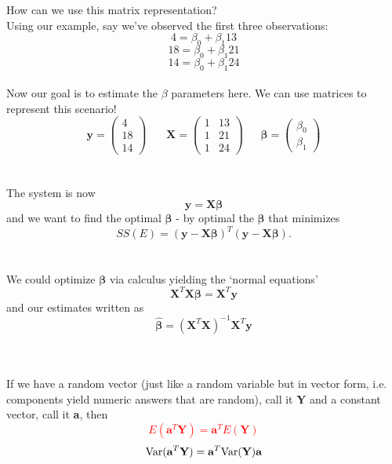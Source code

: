 \Large How can we use this matrix representation?\large\\
Using our example, say we've observed the first three observations:
$$4=\beta_0+\beta_{1}13$$
$$18=\beta_0+\beta_{1}21$$
$$14=\beta_0+\beta_{1}24$$~\\
Now our goal is to estimate the $\beta$ parameters here.  We can use matrices to represent this scenario!
$$\textbf{y}=\left(\begin{array}{c}4 \\ 18\\ 14\end{array}\right)~~~~~~~~\textbf{X}=\left(\begin{array}{cc} 1 & 13\\ 1 & 21 \\ 1 & 24\end{array}\right)~~~~~~~\boldsymbol{\beta}=\left(\begin{array}{c}\beta_0\\\beta_1\end{array}\right)$$
~\\~\\
The system is now
$$\textbf{y}=\textbf{X}\boldsymbol{\beta}$$
and we want to find the optimal $\boldsymbol{\beta}$ - by optimal the $\boldsymbol{\beta}$ that minimizes 
$$SS(E) = (\textbf{y}-\textbf{X}\boldsymbol{\beta})^T(\textbf{y}-\textbf{X}\boldsymbol{\beta}).$$~\\~\\
We could optimize $\boldsymbol{\beta}$ via calculus yielding the `normal equations'
$$\textbf{X}^{T}\textbf{X}\boldsymbol{\beta}=\textbf{X}^{T}\textbf{y}$$
and our estimates written as 
$$\boldsymbol{\hat{\beta}}=\left(\textbf{X}^{T}\textbf{X}\right)^{-1}\textbf{X}^{T}\textbf{y}$$~\\~\\

\newpage

If we have a random vector (just like a random variable but in vector form, i.e. components yield numeric answers that are random), call it $\textbf{Y}$ and a constant vector, call it \textbf{a}, then%
\textcolor{red}{$$E(\textbf{a}^{T}\textbf{Y}) = \textbf{a}^{T}E(\textbf{Y})$$
$$\mbox{Var}(\textbf{a}^{T}\textbf{Y}) = \textbf{a}^{T}\mbox{Var}(\textbf{Y})\textbf{a}$$}~\\~\\

